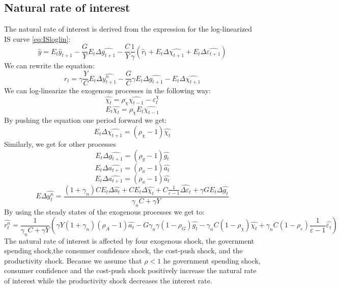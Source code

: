\documentclass[10pt,a4paper]{article}
\begin{document}
\subsection{Natural rate of interest}
The natural rate of interest is derived from the expression for the log-linearized IS curve \eqref{eq:ISloglin}:
\begin{equation}
\hat{y}=E_{t}\hat{y}_{t+1}-\frac{G}{Y}E_{t} \Delta \hat{g_{t+1}}-\frac{C}{Y}\frac{1}{\gamma}\left(\hat{r}_{t}+E_{t}\Delta\hat{\chi_{t+1}} + E_{t}\Delta\hat{\varepsilon_{t+1}}\right)
\end{equation}
We can rewrite the equation:
\begin{equation*}
r_t=\gamma \frac{Y}{C}E_t\Delta\hat{y_{t+1}^n}-\frac{G}{C}\gamma E_t\Delta \hat{g_{t+1}}-E_t\Delta\hat{\chi_{t+1}}
\end{equation*}
We can log-linearize the exogenous processes in the following way:
\begin{equation*}
\hat{\chi_t}= \rho_\chi\hat{\chi_{t-1}}-\varepsilon_t^\chi
\end{equation*}
\begin{equation*}
E_t\hat{\chi_t}=\rho_\chi E_t\hat{\chi_{t-1}}
\end{equation*}
By pushing the equation one period forward we get:
\begin{equation*}
E_t\Delta\hat{\chi_{t+1}}=(\rho_\chi-1)\hat{\chi_t}
\end{equation*}
Similarly, we get for other processes
\begin{equation*}
E_t\Delta\hat{g_{t+1}}=(\rho_g-1)\hat{g_t}
\end{equation*}
\begin{equation*}
E_t\Delta\hat{a_{t+1}}=(\rho_a-1)\hat{a_t}
\end{equation*}
\begin{equation*}
E_t\Delta\hat{a_{t+1}}=(\rho_a-1)\hat{a_t}
\end{equation*}
\begin{equation*}
E\Delta\hat{y_t^n}=\frac
{(1+\gamma_n)CE_t\Delta\hat{a_t}+CE_t\Delta\hat{\chi_t}+C \frac{1}{\varepsilon-1} \hat{\Delta\varepsilon_t}+\gamma G E_t\Delta \hat{g_t}}
{\gamma_nC+\gamma Y}
\end{equation*}
By using the steady states of the exogenous processes we get to:
\begin{equation}\label{naturalInterest}
\hat{r_t^n}=\frac{1}{\gamma_nC+\gamma Y} 
\left(
\gamma Y(1+\gamma_n)(\rho_A-1)\hat{a_t}-G\gamma_n\gamma (1-\rho_G)\hat{g_t}-\gamma_nC(1-\rho_\chi)\hat{\chi_t} +\gamma_nC(1-\rho_\varepsilon)\frac{1}{\varepsilon-1}\hat{\varepsilon_t}
\right)
\end{equation}
The natural rate of interest is affected by four exogenous shock, the government spending shock,the consumer confidence shock, the cost-push shock, and the productivity shock. Because we assume that $\rho < 1$ he government spending shock, consumer confidence and the cost-push shock positively increase the natural rate of interest while the productivity shock decreases the interest rate.
\end{document}
